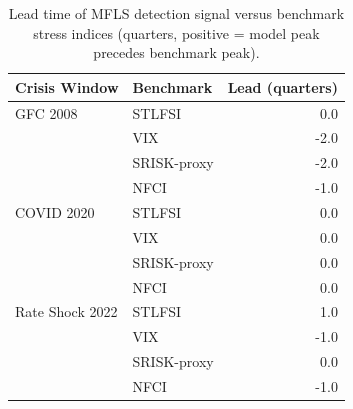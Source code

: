 \begin{table}[h]
\centering
\caption{Lead time of MFLS detection signal versus benchmark stress indices (quarters, positive = model peak precedes benchmark peak).}
\label{tab:lead_times}
\begin{tabular}{llr}
\toprule
Crisis Window & Benchmark & Lead (quarters) \\
\midrule
GFC 2008 & STLFSI & 0.0 \\
 & VIX & -2.0 \\
 & SRISK-proxy & -2.0 \\
 & NFCI & -1.0 \\
COVID 2020 & STLFSI & 0.0 \\
 & VIX & 0.0 \\
 & SRISK-proxy & 0.0 \\
 & NFCI & 0.0 \\
Rate Shock 2022 & STLFSI & 1.0 \\
 & VIX & -1.0 \\
 & SRISK-proxy & 0.0 \\
 & NFCI & -1.0 \\
\bottomrule
\end{tabular}
\end{table}
